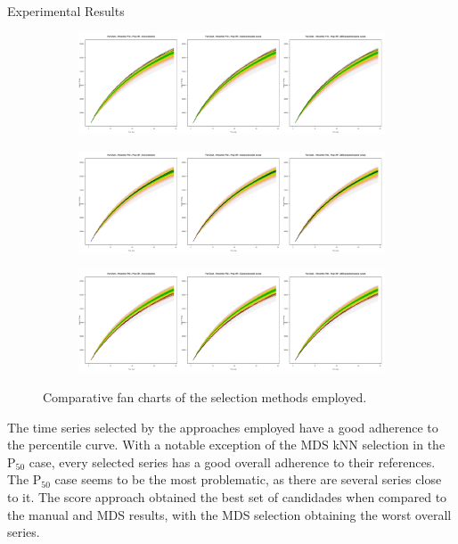 \documentclass[final]{beamer}
\newlength{\twocolwid}
\begin{document}
\begin{frame}[t]
\begin{columns}[t]
\begin{column}{\twocolwid}
\begin{columns}[t,totalwidth=\twocolwid]
\begin{column}{\twocolwid}
\begin{block}{Experimental Results}
\begin{figure}[H]
  \centering
  \begin{subfigure}[b]{0.8\columnwidth}
    \includegraphics[width=\columnwidth]{fanchart-score-brush-mds-p10.pdf}
  \end{subfigure}
  \begin{subfigure}[b]{0.8\columnwidth}
    \includegraphics[width=\columnwidth]{fanchart-score-brush-mds-p50.pdf}
  \end{subfigure}
  \begin{subfigure}[b]{0.8\columnwidth}
    \includegraphics[width=\columnwidth]{fanchart-score-brush-mds-p90.pdf}
  \end{subfigure}
  \caption{Comparative fan charts of the selection methods employed.}
  \label{fig:fan-plots}
\end{figure}

The time series selected by the approaches employed have a good adherence to the percentile curve. With a notable exception of the MDS kNN selection in the P$_{50}$ case, every selected series has a good overall adherence to their references. The P$_{50}$ case seems to be the most problematic, as there are several series close to it. The score approach obtained the best set of candidades when compared to the manual and MDS results, with the MDS selection obtaining the worst overall series.
\end{block}


\end{column}
\end{columns}
\end{column}
\end{columns}
\end{frame}
\end{document}
